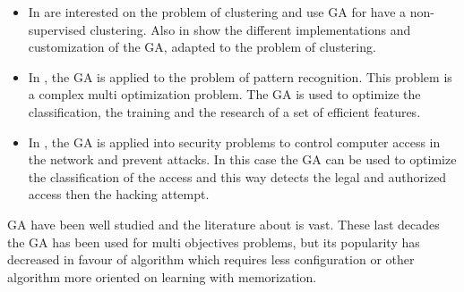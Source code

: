 
\begin{itemize}

\item In \cite{117*sheikh2008} are interested on the problem of clustering and use GA for have a non-supervised clustering. Also in  \cite{117*sheikh2008} show the different implementations and customization of the GA, adapted to the  problem of clustering.
\item In \cite{122*wang1996}, the GA is applied to the problem of pattern recognition. This problem is a complex multi optimization problem. The GA is used to optimize the classification, the training and the research of a set of efficient features. 
\item In \cite{ 123*owais2008}, the GA is applied into security problems to control computer access in the network and prevent attacks. In this case the GA can be used to optimize the classification of the access and this way detects the legal and authorized access then the hacking attempt.   
 
\end{itemize}

GA have been well studied  and the literature about is vast. These last decades the GA  has been used for multi objectives problems, but its popularity has decreased in favour of algorithm which requires less configuration or other algorithm  more oriented on learning with memorization.  
